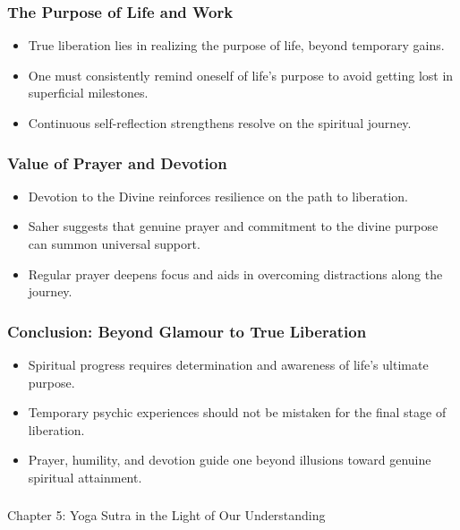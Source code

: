 \begin{frame}[fragile]\frametitle{The Purpose of Life and Work}
    \begin{itemize}
        \item True liberation lies in realizing the purpose of life, beyond temporary gains.
        \item One must consistently remind oneself of life’s purpose to avoid getting lost in superficial milestones.
        \item Continuous self-reflection strengthens resolve on the spiritual journey.
    \end{itemize}
\end{frame}

\begin{frame}[fragile]\frametitle{Value of Prayer and Devotion}
    \begin{itemize}
        \item Devotion to the Divine reinforces resilience on the path to liberation.
        \item Saher suggests that genuine prayer and commitment to the divine purpose can summon universal support.
        \item Regular prayer deepens focus and aids in overcoming distractions along the journey.
    \end{itemize}
\end{frame}

\begin{frame}[fragile]\frametitle{Conclusion: Beyond Glamour to True Liberation}
    \begin{itemize}
        \item Spiritual progress requires determination and awareness of life’s ultimate purpose.
        \item Temporary psychic experiences should not be mistaken for the final stage of liberation.
        \item Prayer, humility, and devotion guide one beyond illusions toward genuine spiritual attainment.
    \end{itemize}
\end{frame}




\begin{frame}[fragile]\frametitle{}
\begin{center}
{\Large Chapter 5: Yoga Sutra in the Light of Our Understanding }
\end{center}
\end{frame}


